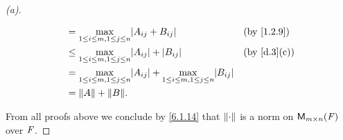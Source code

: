 \begin{proof}[(a)]
\begin{description}
\begin{align*}
                     & = \max_{1 \leq i \leq m, 1 \leq j \leq n} \abs{A_{i j} + B_{i j}}                                               &  & \text{(by \cref{1.2.9})}  \\
                     & \leq \max_{1 \leq i \leq m, 1 \leq j \leq n} \abs{A_{i j}} + \abs{B_{i j}}                                      &  & \text{(by \cref{d.3}(c))} \\
                     & = \max_{1 \leq i \leq m, 1 \leq j \leq n} \abs{A_{i j}} + \max_{1 \leq i \leq m, 1 \leq j \leq n} \abs{B_{i j}}                                \\
                     & = \norm{A} + \norm{B}.
      \end{align*}
  \end{description}
  From all proofs above we conclude by \cref{6.1.14} that \(\left\lVert\cdot\right\rVert\) is a norm on \(\mathsf{M}_{{m} \times n}({\mathit{F}})\) over \(\mathit{F}\).
\end{proof}

